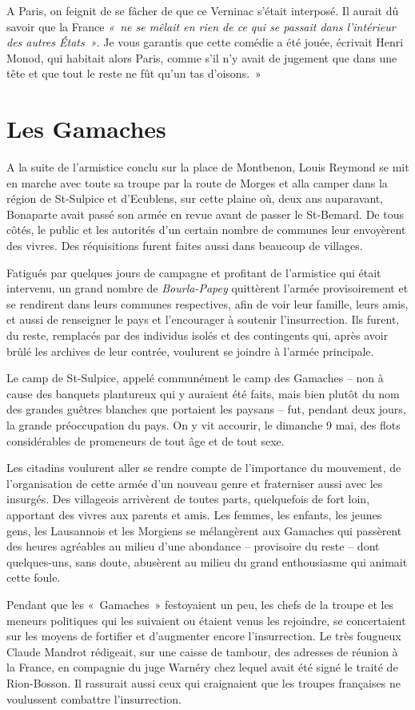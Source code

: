 \documentclass[french,twoside]{book} %
\begin{document}
\noindent A Paris, on feignit de se fâcher de que ce Verninac s’était interposé. Il aurait dû savoir que la France \emph{« ne se mêlait en rien de ce qui se passait dans l’intérieur des autres États »}. Je vous garantis que cette comédie a été jouée, écrivait Henri Monod, qui habitait alors Paris, comme s’il n’y avait de jugement que dans une tête et que tout le reste ne fût qu’un tas d’oisons. »
\section[{Les Gamaches}]{Les Gamaches}
\noindent A la suite de l’armistice conclu sur la place de Montbenon, Louis Reymond se mit en marche avec toute sa troupe par la route de Morges et alla camper dans la région de St-Sulpice et d’Ecublens, sur cette plaine où, deux ans auparavant, Bonaparte avait passé son armée en revue avant de passer le St-Bemard. De tous côtés, le public et les autorités d’un certain nombre de communes leur envoyèrent des vivres. Des réquisitions furent faites aussi dans beaucoup de villages.\par
Fatigués par quelques jours de campagne et profitant de l’armistice qui était intervenu, un grand nombre de \emph{Bourla-Papey} quittèrent l’armée provisoirement et se rendirent dans leurs communes respectives, afin de voir leur famille, leurs amis, et aussi de renseigner le pays et l’encourager à soutenir l’insurrection. Ils furent, du reste, remplacés par des individus isolés et des contingents qui, après avoir brûlé les archives de leur contrée, voulurent se joindre à l’armée principale.\par
Le camp de St-Sulpice, appelé communément le camp des Gamaches – non à cause des banquets plantureux qui y auraient été faits, mais bien plutôt du nom des grandes guêtres blanches que portaient les paysans – fut, pendant deux jours, la grande préoccupation du pays. On y vit accourir, le dimanche 9 mai, des flots considérables de promeneurs de tout âge et de tout sexe.\par
Les citadins voulurent aller se rendre compte de l’importance du mouvement, de l’organisation de cette armée d’un nouveau genre et fraterniser aussi avec les insurgés. Des villageois arrivèrent de toutes parts, quelquefois de fort loin, apportant des vivres aux parents et amis. Les femmes, les enfants, les jeunes gens, les Lausannois et les Morgiens se mélangèrent aux Gamaches qui passèrent des heures agréables au milieu d’une abondance – provisoire du reste – dont quelques-uns, sans doute, abusèrent au milieu du grand enthousiasme qui animait cette foule.\par
Pendant que les « Gamaches » festoyaient un peu, les chefs de la troupe et les meneurs politiques qui les suivaient ou étaient venus les rejoindre, se concertaient sur les moyens de fortifier et d’augmenter encore l’insurrection. Le très fougueux Claude Mandrot rédigeait, sur une caisse de tambour, des adresses de réunion à la France, en compagnie du juge Warnéry chez lequel avait été signé le traité de Rion-Bosson. Il rassurait aussi ceux qui craignaient que les troupes françaises ne voulussent combattre l’insurrection.\par
\end{document}

